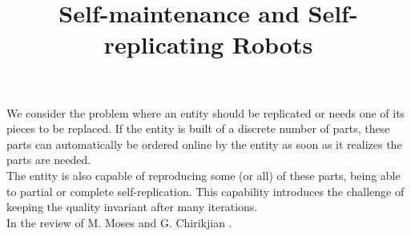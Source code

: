 \documentclass[12pt]{article}
\theoremstyle{definition}
\theoremstyle{remark}
\begin{document}
\title{Self-maintenance and Self-replicating Robots}
\date{\vspace{-5ex}}
\maketitle

We consider the problem where an entity should be replicated or needs one of its pieces to be replaced. If the entity is built of a discrete number of parts, these parts can automatically be ordered online by the entity as soon as it realizes the parts are needed.\\

The entity is also capable of reproducing some (or all) of these parts, being able to partial or complete self-replication. This capability introduces the challenge of keeping the quality invariant after many iterations.\\

In the review of M. Moses and G. Chirikjian \cite{doi:10.1146/annurev-control-071819-010010}.

 
\end{document}
